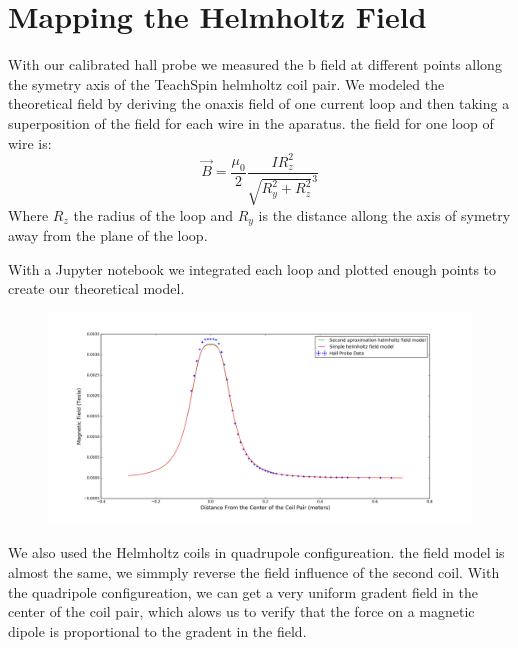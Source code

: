\documentclass[aps,twocolumn,secnumarabic,balancelastpage,amsmath,amssymb,nofootinbib,floatfix]{revtex4-1}
\begin{document}
\section{Mapping the Helmholtz Field}
With our calibrated hall probe we measured the b field at different points allong the symetry  axis of the TeachSpin helmholtz coil pair. We modeled the theoretical field by deriving the onaxis field of one current loop and then taking a superposition of the field for each wire in the aparatus. the field for one loop of wire is:
$$\vec{B}=\frac{\mu_0}{2}\frac{I R_z^2}{\sqrt{R_y^2 + R_z^2}^3}$$
Where $R_z$ the radius of the loop and $R_y$ is the distance allong the axis of symetry away from the plane of the loop. 

With a Jupyter notebook we integrated each loop and plotted enough points to create our theoretical model. 

\begin{figure}[here]
\includegraphics[width=1\textwidth]{../DataValidation/helmholtzPlot.png}
\caption{}
\label{apparatus}
\end{figure}

We also used the Helmholtz coils in quadrupole configureation. the field model is almost the same, we simmply reverse the field influence of the second coil. With the quadripole configureation, we can get a very uniform gradent field in the center of the coil pair, which alows us to verify that the force on a magnetic dipole is proportional to the gradent in the field. 



\end{document}
